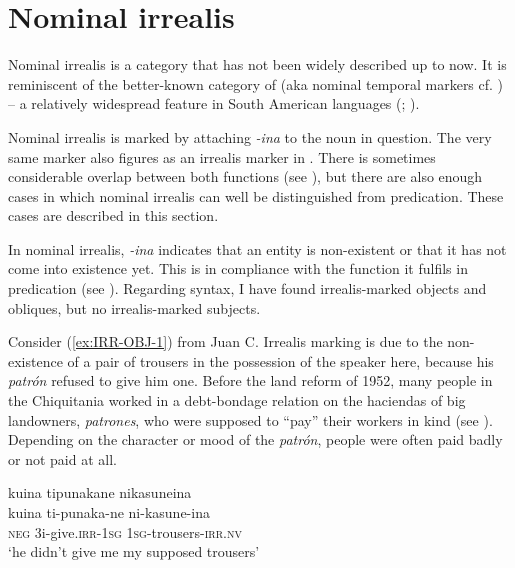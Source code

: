 
\section{Nominal irrealis}\label{NominalRS}

Nominal irrealis is a category that has not been widely described up to now. It is reminiscent of the better-known category of  \citep[]{NordlingerSadler2004} (aka nominal temporal markers cf. \citealt[]{Tonhauser2008}) – a relatively widespread feature in South American languages (\citealt[158--163]{Aikhenvald2012}; \citealt[258]{Campbell2012}).

Nominal irrealis is marked by attaching \textit{-ina} to the noun in question. The very same marker also figures as an irrealis marker in . There is sometimes considerable overlap between both functions (see ), but there are also enough cases in which nominal irrealis can well be distinguished from predication. These cases are described in this section.

In nominal irrealis, \textit{-ina} indicates that an entity is non-existent or that it has not come into existence yet. This is in compliance with the function it fulfils in predication (see ). Regarding syntax, I have found irrealis-marked objects and obliques, but no irrealis-marked subjects.

Consider (\ref{ex:IRR-OBJ-1}) from Juan C. Irrealis marking is due to the non-existence of a pair of trousers in the possession of the speaker here, because his \textit{patrón} refused to give him one. Before the land reform of 1952, many people in the Chiquitania worked in a debt-bondage relation on the haciendas of big landowners, \textit{patrones}, who were supposed to “pay” their workers in kind (see ). Depending on the character or mood of the \textit{patrón}, people were often paid badly or not paid at all.

\ea\label{ex:IRR-OBJ-1}
\begingl 
\glpreamble kuina tipunakane nikasuneina\\
\gla kuina ti-punaka-ne ni-kasune-ina\\ 
\glb \textsc{neg} 3i-give.\textsc{irr}-1\textsc{sg} 1\textsc{sg}-trousers-\textsc{irr.nv}\\ 
\glft ‘he didn’t give me my supposed trousers’\\ 
\endgl
\trailingcitation{[mqx-p110826l.458]}
\xe

